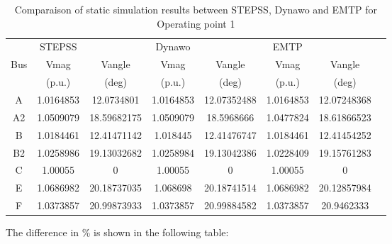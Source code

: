 \documentclass{report}
\begin{document}
\begin{table}[H]
\centering
\caption{Comparaison of static simulation results between STEPSS, Dynawo and EMTP for Operating point 1}

\begin{tabular}{c|c c|c c|c c|c|} 
& STEPSS && Dynawo  && EMTP && \\ 
Bus & Vmag  & Vangle  & Vmag & Vangle &  Vmag & Vangle & \\ 
&   (p.u.) & (deg) &  (p.u.) & (deg) &  (p.u.) & (deg) &\\
\hline
A & 1.0164853 & 12.0734801 & 1.0164853 & 12.07352488 & 1.0164853 & 12.07248368 \\ 
A2 & 1.0509079 & 18.59682175 & 1.0509079 & 18.5968666 & 1.0477824 & 18.61866523 \\
B & 1.0184461 & 12.41471142 & 1.018445 & 12.41476747 & 1.0184461 & 12.41454252 \\
B2 & 1.0258986 & 19.13032682 & 1.0258984 & 19.13042386 & 1.0228409 & 19.15761283 \\
C & 1.00055 & 0 & 1.00055 & 0 & 1.00055 & 0 \\
E & 1.0686982 & 20.18737035 & 1.068698 & 20.18741514 & 1.0686982 & 20.12857984 \\
F & 1.0373857 & 20.99873933 & 1.0373857 & 20.99884582 & 1.0373857 & 20.9462333 \\ 
\end{tabular}
\label{static_OP1}
\end{table}
The difference in \% is shown in the following table:
\end{document}
